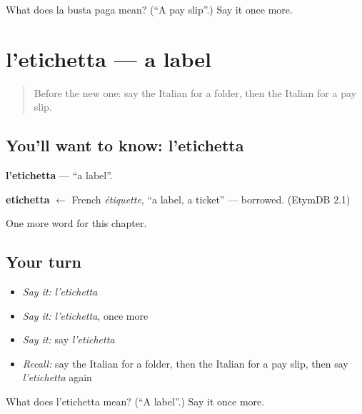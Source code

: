 \begin{tcolorbox}[breakable,colback=teal!4,colframe=teal!35!black,title={Before you move on}]
What does la busta paga mean? (\textquotedblleft{}A pay slip\textquotedblright{}.) Say it once more.
\end{tcolorbox}
\section[l'etichetta]{l'etichetta — a label}

\label{lesson:IT-C198-etichetta}



\begin{quote}
Before the new one: say the Italian for a folder, then the Italian for a pay slip.
\end{quote}

\subsection*{You'll want to know: l'etichetta}
\textbf{l'etichetta} — \textquotedblleft{}a label\textquotedblright{}.

\begin{cousinweb}
\textbf{etichetta} $\leftarrow$ French \emph{étiquette}, \textquotedblleft{}a label, a ticket\textquotedblright{} — borrowed. (EtymDB 2.1)
\end{cousinweb}

\begin{grammarlens}[title={What you've built}]
One more word for this chapter.
\end{grammarlens}

\subsection*{Your turn}
\begin{itemize}
\raggedright
  \item \emph{Say it:} \emph{l'etichetta}
  \item \emph{Say it:} \emph{l'etichetta}, once more
  \item \emph{Say it:} say \emph{l'etichetta}
  \item \emph{Recall:} say the Italian for a folder, then the Italian for a pay slip, then say \emph{l'etichetta} again
\end{itemize}

\begin{tcolorbox}[breakable,colback=teal!4,colframe=teal!35!black,title={Before you move on}]
What does l'etichetta mean? (\textquotedblleft{}A label\textquotedblright{}.) Say it once more.
\end{tcolorbox}
